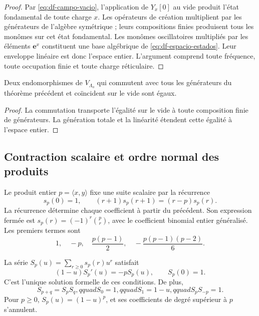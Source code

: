 \begin{proof}
Par \eqref{eq:df-campo-vacio}, l’application de \(Y_x[0]\) au vide produit l’état fondamental de toute charge \(x\). Les opérateurs de création multiplient par les générateurs de l’algèbre symétrique ; leurs compositions finies produisent tous les monômes sur cet état fondamental. Les monômes oscillatoires multipliés par les éléments \(\mathbf e^x\) constituent une base algébrique de \eqref{eq:df-espacio-estados}. Leur enveloppe linéaire est donc l’espace entier. L’argument comprend toute fréquence, toute occupation finie et toute charge réticulaire.
\end{proof}

\begin{corollary}
Deux endomorphismes de \(V_{\Lambda_o}\) qui commutent avec tous les générateurs du théorème précédent et coïncident sur le vide sont égaux.
\end{corollary}

\begin{proof}
La commutation transporte l’égalité sur le vide à toute composition finie de générateurs. La génération totale et la linéarité étendent cette égalité à l’espace entier.
\end{proof}

\subsection{Contraction scalaire et ordre normal des produits}
\label{subsec:df-contraccion}


Le produit entier \(p=\langle x,y\rangle\) fixe une suite scalaire par la récurrence
\begin{equation}
 s_p(0)=1,\qquad
 (r+1)s_p(r+1)=(r-p)s_p(r).
 \label{eq:df-contraccion-recurrencia}
\end{equation}
La récurrence détermine chaque coefficient à partir du précédent. Son expression fermée est \(s_p(r)=(-1)^r\binom pr\), avec le coefficient binomial entier généralisé. Les premiers termes sont
\[
 1,\quad -p,\quad \frac{p(p-1)}2,\quad
 -\frac{p(p-1)(p-2)}6.
\]

\begin{proposition}
\label{prop:df-factor-contraccion} La série \(S_p(u)=\sum_{r\geq0}s_p(r)u^r\) satisfait
\begin{equation}
 (1-u)S_p'(u)=-pS_p(u),\qquad S_p(0)=1.
 \label{eq:df-ecuacion-factor}
\end{equation}
C’est l’unique solution formelle de ces conditions. De plus,
\[
 S_{p+q}=S_pS_q,qquad S_0=1,qquad S_1=1-u,qquad
 S_pS_{-p}=1.
\]
Pour \(p\geq0\), \(S_p(u)=(1-u)^p\), et ses coefficients de degré supérieur à \(p\) s’annulent.
\end{proposition}

